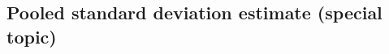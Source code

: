 %
%
%



\subsection{Pooled standard deviation estimate (special topic)}
\label{pooledStandardDeviations}

